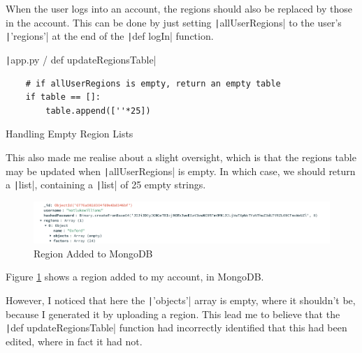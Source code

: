 \documentclass[12pt]{report}
\newcommand{\pil}[1]{\protect\texttt|#1|}
\begin{document}
When the user logs into an account, the regions should also be replaced by those in the account. This can be done by just setting \pil{allUserRegions} to the user's \pil{'regions'} at the end of the \pil{def logIn} function.

\begin{listing}[H]
\pil{app.py / def updateRegionsTable}
\begin{verbatim}
    # if allUserRegions is empty, return an empty table
    if table == []:
        table.append([''*25])
\end{verbatim}
\caption{Handling Empty Region Lists}\label{cs:updateRegionsEmptyTable}
\end{listing}

This also made me realise about a slight oversight, which is that the regions table may be updated when \pil{allUserRegions} is empty. In which case, we should return a \pil{list}, containing a \pil{list} of 25 empty strings.

\begin{figure}[H]
\centering
\includegraphics[width=14cm]{ss20.11.png}
\caption{Region Added to MongoDB}\label{fig:ss20.11}
\end{figure}

Figure \ref{fig:ss20.11} shows a region added to my account, in MongoDB.

\begin{center}
\end{center}

However, I noticed that here the \pil{'objects'} array is empty, where it shouldn't be, because I generated it by uploading a region. This lead me to believe that the \pil{def updateRegionsTable} function had incorrectly identified that this had been edited, where in fact it had not.
\end{document}

